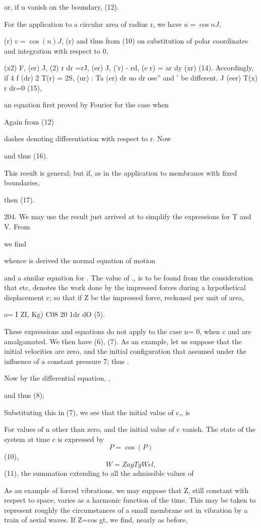 or, if u vanish on the boundary, (12).

For the application to a circular area of radius r, we have
\(
u=\cos n J,
\)

(r)
\( v=\cos(n) J\),
(r) and thus from (10) on substitution of polar
coordinates and integration with respect to 0,

(x2) F, (er) J, (2) r dr =rJ, (er) J, ('r) - rd, (e r) = ar dy (xr)
(14). Accordingly, if 4 f (dr) 2 T(r) = 2S, (ur) : Ta (er) dr uo dr
ose'' and ' be different, J (eer) T(x) r dr=0 (15),

an equation first proved by Fourier for the case when

Again from (12)

dashes denoting differentiation with respect to r. Now

and thus (16).

This result is general; but if, as in the application to membranes with
fixed boundaries,

then (17).

204. We may use the result just arrived at to simplify the expressions
for T and V. From

we find

whence is derived the normal equation of motion

and a similar equation for . The value of ,, is to be found from the
consideration that etc, denotes the work done by the impressed forces
during a hypothetical displacement c; so that if Z be the impressed
force, reckoned per unit of area,

o= I ZI, Kg) C08 20 1dr dO (5).

These expressions and equations do not apply to the case n= 0, when c
and are amalgamated. We then have (6), (7). As an example, let us
suppose that the initial velocities are zero, and the initial
configuration that assumed under the influence of a constant pressure 7;
thus .

Now by the differential equation, ,

and thus (8);

Substituting this in (7), we see that the initial value of c,, is

For values of n other than zero, and the initial value of c vanish. The
state of the system at time c is expressed by
\[P =  \cos(P)\]
(10),
\[ W = Zag Ty Wel,\]
(11), the summation extending to all the admissible values of

As an example of forced vibrations, we may suppose that Z, still
constant with respect to space, varies as a harmonic function of the
time. This may be taken to represent roughly the circumstances of a
small membrane set in vibration by a train of aerial waves. If Z=cos gt,
we find, nearly as before,

